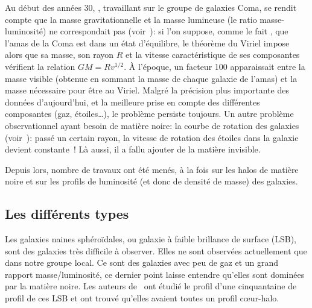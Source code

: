 			Au début des années 30, , travaillant sur
			le groupe de galaxies Coma, se rendit compte que la
			masse gravitationnelle et la masse lumineuse (le ratio
			masse-luminosité) ne correspondait pas
			(voir~\cite{1933AcHPh...6..110Z}): si l'on suppose,
			comme le fait , que l'amas de la Coma est
			dans un état d'équilibre, le théorème du Viriel impose
			alors que sa masse, son rayon $R$ et la vitesse
			caractéristique de ses composantes vérifient la
			relation $GM = R v^{1/2}$. À l'époque, un facteur 100
			apparaissait entre la masse visible (obtenue en sommant
			la masse de chaque galaxie de l'amas) et la masse
			nécessaire pour être au Viriel. Malgré la précision
			plus importante des données d'aujourd'hui, et la
			meilleure prise en compte des différentes composantes
			(gaz, étoiles\ldots), le problème persiste toujours. Un
			autre problème observationnel ayant besoin de matière
			noire: la courbe de rotation des galaxies
			(voir~\cite{1939LicOB..19...41B}): passé un certain
			rayon, la vitesse de rotation des étoiles dans la
			galaxie devient constante~! Là aussi, il a fallu ajouter de la matière invisible.


			Depuis lors, nombre de travaux ont été menés, à la fois sur les halos de
			matière noire et sur les profils de luminosité (et donc de densité de masse)
			des galaxies.

		\subsection{Les différents types}

			Les galaxies naines sphéroïdales, ou galaxie à faible brillance de surface
			(LSB), sont des galaxies très difficile à observer. Elles ne sont observées
			actuellement que dans notre groupe local. Ce sont des galaxies avec peu de
			gaz et un grand rapport masse/luminosité, ce dernier point laisse entendre
			qu'elles sont dominées par la matière noire. Les auteurs
			de~\cite{2001ApJ...552L..23D} ont étudié le profil d'une cinquantaine de
			profil de ces LSB et ont trouvé qu'elles avaient toutes un profil cœur-halo.

